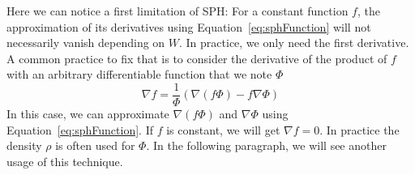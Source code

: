 Here we can notice a first limitation of SPH: For a constant function $f$, the approximation of its derivatives using Equation~\eqref{eq:sphFunction} will not necessarily vanish depending on $W$. In practice, we only need the first derivative. A common practice to fix that is to consider the derivative of the product of $f$ with an arbitrary differentiable function that we note $\Phi$
\begin{equation}
\label{eq:hackSPH}
\nabla f = \frac{1}{\Phi}\left(\nabla (f \Phi) - f \nabla \Phi \right)
\end{equation}
In this case, we can approximate $\nabla(f\Phi)$ and $\nabla \Phi$ using Equation~\eqref{eq:sphFunction}. If $f$ is constant, we will get $\nabla f = 0$. In practice the density $\rho$ is often used for $\Phi$. In the following paragraph, we will see another usage of this technique.
